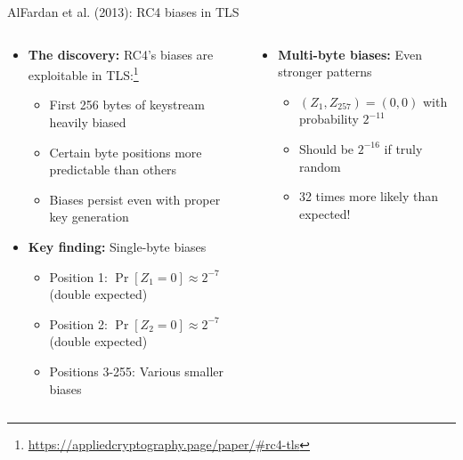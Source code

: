 \documentclass[aspectratio=169, lualatex, handout]{beamer}
\begin{document}
\begin{frame}{AlFardan et al. (2013): RC4 biases in TLS}
	\begin{columns}[c]
		\begin{column}{0.6\textwidth}
			\begin{itemize}
				\item \textbf{The discovery:} RC4's biases are exploitable in TLS:\footnote{\url{https://appliedcryptography.page/paper/\#rc4-tls}}
				      \begin{itemize}
					      \item First 256 bytes of keystream heavily biased
					      \item Certain byte positions more predictable than others
					      \item Biases persist even with proper key generation
				      \end{itemize}
				\item \textbf{Key finding:} Single-byte biases
				      \begin{itemize}
					      \item Position 1: $\Pr[Z_1 = 0] \approx 2^{-7}$ (double expected)
					      \item Position 2: $\Pr[Z_2 = 0] \approx 2^{-7}$ (double expected)
					      \item Positions 3-255: Various smaller biases
				      \end{itemize}
			\end{itemize}
		\end{column}
		\begin{column}{0.4\textwidth}
			\begin{itemize}
				\item \textbf{Multi-byte biases:} Even stronger patterns
				      \begin{itemize}
					      \item $(Z_1, Z_{257}) = (0, 0)$ with probability $2^{-11}$
					      \item Should be $2^{-16}$ if truly random
					      \item 32 times more likely than expected!
				      \end{itemize}
			\end{itemize}
		\end{column}
	\end{columns}
\end{frame}
\end{document}
